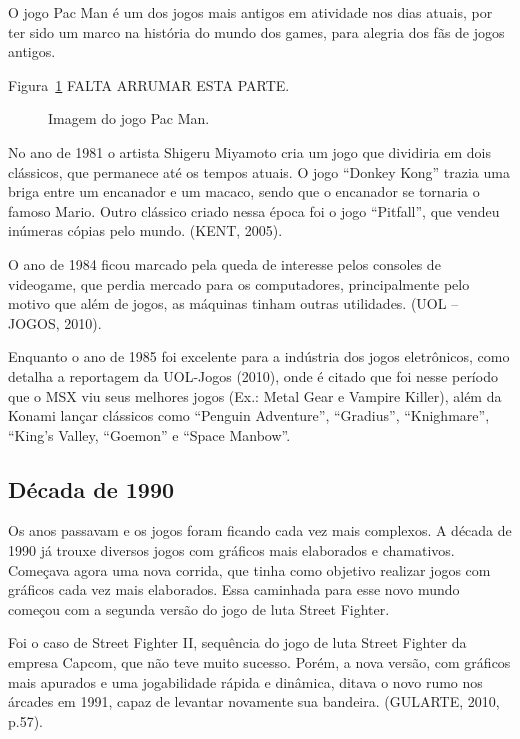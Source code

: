 O jogo Pac Man é um dos jogos mais antigos em atividade nos dias atuais, por ter sido um marco na história do mundo dos games, para alegria dos fãs de jogos antigos.

Figura~\ref{f1.2} FALTA ARRUMAR ESTA PARTE.
\begin{figure}[!hbp]
\makebox[\textwidth]{\framebox[5cm]{\rule{0pt}{5cm}}}
\caption{Imagem do jogo Pac Man.} \label{f1.2}
\end{figure}

No ano de 1981 o artista Shigeru Miyamoto cria um jogo que dividiria em dois clássicos, que permanece até os tempos atuais. O jogo “Donkey Kong” trazia uma briga entre um encanador e um macaco, sendo que o encanador se tornaria o famoso Mario. Outro clássico criado nessa época foi o jogo “Pitfall”, que vendeu inúmeras cópias pelo mundo. (KENT, 2005).

O ano de 1984 ficou marcado pela queda de interesse pelos consoles de videogame, que perdia mercado para os computadores, principalmente pelo motivo que além de jogos, as máquinas tinham outras utilidades. (UOL – JOGOS, 2010).

Enquanto o ano de 1985 foi excelente para a indústria dos jogos eletrônicos, como detalha a reportagem da UOL-Jogos (2010), onde é citado que foi nesse período que o MSX viu seus melhores jogos (Ex.: Metal Gear e Vampire Killer), além da Konami lançar clássicos como “Penguin Adventure”, “Gradius”, “Knighmare”, “King’s Valley, “Goemon” e “Space Manbow”.

\subsection{Década de 1990}

Os anos passavam e os jogos foram ficando cada vez mais complexos. A década de 1990 já trouxe diversos jogos com gráficos mais elaborados e chamativos. Começava agora uma nova corrida, que tinha como objetivo realizar jogos com gráficos cada vez mais elaborados. Essa caminhada para esse novo mundo começou com a segunda versão do jogo de luta Street Fighter.

\begin{citacao}
Foi o caso de Street Fighter II, sequência do jogo de luta Street Fighter da empresa Capcom, que não teve muito sucesso. Porém, a nova versão, com gráficos mais apurados e uma jogabilidade rápida e dinâmica, ditava o novo rumo nos árcades em 1991, capaz de levantar novamente sua bandeira. (GULARTE, 2010, p.57).
\end{citacao}

